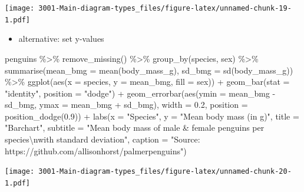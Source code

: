 \documentclass[
]{book}
\newenvironment{Shaded}{\begin{snugshade}}{\end{snugshade}}
\newcommand{\AttributeTok}[1]{\textcolor[rgb]{0.77,0.63,0.00}{#1}}
\newcommand{\FloatTok}[1]{\textcolor[rgb]{0.00,0.00,0.81}{#1}}
\newcommand{\FunctionTok}[1]{\textcolor[rgb]{0.00,0.00,0.00}{#1}}
\newcommand{\NormalTok}[1]{#1}
\newcommand{\SpecialCharTok}[1]{\textcolor[rgb]{0.00,0.00,0.00}{#1}}
\newcommand{\StringTok}[1]{\textcolor[rgb]{0.31,0.60,0.02}{#1}}
\providecommand{\tightlist}{%
  \setlength{\itemsep}{0pt}\setlength{\parskip}{0pt}}
\begin{document}
\texttt{[image: 3001-Main-diagram-types\_files/figure-latex/unnamed-chunk-19-1.pdf]}

\begin{itemize}
\tightlist
\item
  alternative: set y-values
\end{itemize}

\begin{Shaded}
\begin{Highlighting}[]
\NormalTok{penguins }\SpecialCharTok{\%\textgreater{}\%}
    \FunctionTok{remove\_missing}\NormalTok{() }\SpecialCharTok{\%\textgreater{}\%}
    \FunctionTok{group\_by}\NormalTok{(species, sex) }\SpecialCharTok{\%\textgreater{}\%}
    \FunctionTok{summarise}\NormalTok{(}\AttributeTok{mean\_bmg =} \FunctionTok{mean}\NormalTok{(body\_mass\_g),}
              \AttributeTok{sd\_bmg =} \FunctionTok{sd}\NormalTok{(body\_mass\_g)) }\SpecialCharTok{\%\textgreater{}\%}
    \FunctionTok{ggplot}\NormalTok{(}\FunctionTok{aes}\NormalTok{(}\AttributeTok{x =}\NormalTok{ species, }\AttributeTok{y =}\NormalTok{ mean\_bmg,}
               \AttributeTok{fill =}\NormalTok{ sex)) }\SpecialCharTok{+}
    \FunctionTok{geom\_bar}\NormalTok{(}\AttributeTok{stat =} \StringTok{"identity"}\NormalTok{, }\AttributeTok{position =} \StringTok{"dodge"}\NormalTok{) }\SpecialCharTok{+}
    \FunctionTok{geom\_errorbar}\NormalTok{(}\FunctionTok{aes}\NormalTok{(}\AttributeTok{ymin =}\NormalTok{ mean\_bmg }\SpecialCharTok{{-}}\NormalTok{ sd\_bmg, }
                      \AttributeTok{ymax =}\NormalTok{ mean\_bmg }\SpecialCharTok{+}\NormalTok{ sd\_bmg), }
                  \AttributeTok{width =} \FloatTok{0.2}\NormalTok{,}
                 \AttributeTok{position =} \FunctionTok{position\_dodge}\NormalTok{(}\FloatTok{0.9}\NormalTok{)) }\SpecialCharTok{+}
      \FunctionTok{labs}\NormalTok{(}\AttributeTok{x =} \StringTok{"Species"}\NormalTok{, }
           \AttributeTok{y =} \StringTok{"Mean body mass (in g)"}\NormalTok{,}
          \AttributeTok{title =} \StringTok{"Barchart"}\NormalTok{, }
          \AttributeTok{subtitle =} \StringTok{"Mean body mass of male \& female penguins per species}\SpecialCharTok{\textbackslash{}n}\StringTok{with standard deviation"}\NormalTok{,}
          \AttributeTok{caption =} \StringTok{"Source: https://github.com/allisonhorst/palmerpenguins"}\NormalTok{)}
\end{Highlighting}
\end{Shaded}

\texttt{[image: 3001-Main-diagram-types\_files/figure-latex/unnamed-chunk-20-1.pdf]}
\end{document}
